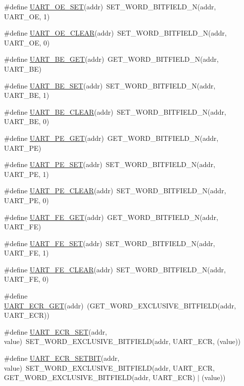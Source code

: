 \begin{DoxyCompactItemize}
\item 
\#define \hyperlink{a00574_a8b171166c4db597319c52bd7ce0db19b}{UART\_\-OE\_\-SET}(addr)~SET\_\-WORD\_\-BITFIELD\_\-N(addr, UART\_\-OE, 1)
\item 
\#define \hyperlink{a00574_adff95df497c0d84f3b84a33817c21946}{UART\_\-OE\_\-CLEAR}(addr)~SET\_\-WORD\_\-BITFIELD\_\-N(addr, UART\_\-OE, 0)
\item 
\#define \hyperlink{a00574_a673b158301f6a41e9de23240653b4e89}{UART\_\-BE\_\-GET}(addr)~GET\_\-WORD\_\-BITFIELD\_\-N(addr, UART\_\-BE)
\item 
\#define \hyperlink{a00574_ab3100468f8ba2ecddae1f81273d5a1d4}{UART\_\-BE\_\-SET}(addr)~SET\_\-WORD\_\-BITFIELD\_\-N(addr, UART\_\-BE, 1)
\item 
\#define \hyperlink{a00574_a7af854e5e671bdf003ccdab1cf25b178}{UART\_\-BE\_\-CLEAR}(addr)~SET\_\-WORD\_\-BITFIELD\_\-N(addr, UART\_\-BE, 0)
\item 
\#define \hyperlink{a00574_a6b04a2cd34d39821aade0deb38c2e20e}{UART\_\-PE\_\-GET}(addr)~GET\_\-WORD\_\-BITFIELD\_\-N(addr, UART\_\-PE)
\item 
\#define \hyperlink{a00574_a886dd141399dd904249e158bdb153052}{UART\_\-PE\_\-SET}(addr)~SET\_\-WORD\_\-BITFIELD\_\-N(addr, UART\_\-PE, 1)
\item 
\#define \hyperlink{a00574_a074beef3eb921e338268d56736dbf703}{UART\_\-PE\_\-CLEAR}(addr)~SET\_\-WORD\_\-BITFIELD\_\-N(addr, UART\_\-PE, 0)
\item 
\#define \hyperlink{a00574_a086b2b679bfb8cb167e59fe9f1b72770}{UART\_\-FE\_\-GET}(addr)~GET\_\-WORD\_\-BITFIELD\_\-N(addr, UART\_\-FE)
\item 
\#define \hyperlink{a00574_a92703cfac93b7d472dfcd1f16571e000}{UART\_\-FE\_\-SET}(addr)~SET\_\-WORD\_\-BITFIELD\_\-N(addr, UART\_\-FE, 1)
\item 
\#define \hyperlink{a00574_a68334c700afa7a7d7be462606e367367}{UART\_\-FE\_\-CLEAR}(addr)~SET\_\-WORD\_\-BITFIELD\_\-N(addr, UART\_\-FE, 0)
\item 
\#define \hyperlink{a00574_ad98157501cc1e5568a64c002dda86f2f}{UART\_\-ECR\_\-GET}(addr)~(GET\_\-WORD\_\-EXCLUSIVE\_\-BITFIELD(addr, UART\_\-ECR))
\item 
\#define \hyperlink{a00574_ad8d03659fd0fd2ab0119e27e7bc98eab}{UART\_\-ECR\_\-SET}(addr, value)~SET\_\-WORD\_\-EXCLUSIVE\_\-BITFIELD(addr, UART\_\-ECR, (value))
\item 
\#define \hyperlink{a00574_a6dc9e6f27ee41aabe956cfc85f4d4a1c}{UART\_\-ECR\_\-SETBIT}(addr, value)~SET\_\-WORD\_\-EXCLUSIVE\_\-BITFIELD(addr, UART\_\-ECR, GET\_\-WORD\_\-EXCLUSIVE\_\-BITFIELD(addr, UART\_\-ECR) $|$ (value))

\end{DoxyCompactItemize}

